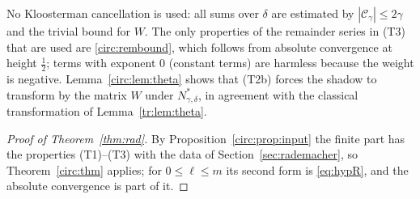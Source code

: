 \begin{remark}
No Kloosterman cancellation is used: all sums over $\delta$ are estimated by $|\mathcal C_\gamma|\le2\gamma$ and the trivial bound for $W$. The only properties of the remainder series in (T3) that are used are \eqref{circ:rembound}, which follows from absolute convergence at height $\frac12$; terms with exponent $0$ (constant terms) are harmless because the weight is negative. Lemma~\ref{circ:lem:theta} shows that (T2b) forces the shadow to transform by the matrix $W$ under $N^*_{\gamma,\delta}$, in agreement with the classical transformation of Lemma~\ref{tr:lem:theta}.
\end{remark}

\begin{proof}[Proof of Theorem~\textup{\ref{thm:rad}}]
By Proposition~\ref{circ:prop:input} the finite part has the properties (T1)--(T3) with the data of Section~\ref{sec:rademacher}, so Theorem~\ref{circ:thm} applies; for $0\le\ell\le m$ its second form is \eqref{eq:hypR}, and the absolute convergence is part of it.
\end{proof}
